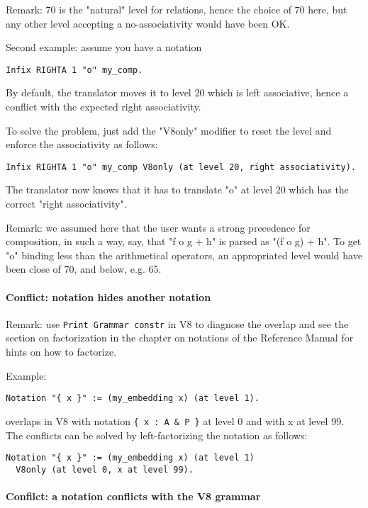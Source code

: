 \documentclass[11pt,a4paper]{article}
\begin{document}
Remark: 70 is the "natural" level for relations, hence the choice of 70
here, but any other level accepting a no-associativity would have been
OK.

Second example: assume you have a notation
\begin{verbatim}
Infix RIGHTA 1 "o" my_comp.
\end{verbatim}
By default, the translator moves it to level 20 which is left
associative, hence a conflict with the expected right associativity.

To solve the problem, just add the "V8only" modifier to reset the
level and enforce the associativity as follows:
\begin{verbatim}
Infix RIGHTA 1 "o" my_comp V8only (at level 20, right associativity).
\end{verbatim}
The translator now knows that it has to translate "o" at level 20
which has the correct "right associativity".

Remark: we assumed here that the user wants a strong precedence for
composition, in such a way, say, that "f o g + h" is parsed as
"(f o g) + h". To get "o" binding less than the arithmetical operators,
an appropriated level would have been close of 70, and below, e.g. 65.


\paragraph{Conflict: notation hides another notation}

Remark: use {\tt Print Grammar constr} in V8 to diagnose the overlap
and see the section on factorization in the chapter on notations of
the Reference Manual for hints on how to factorize.

Example:
\begin{verbatim}
Notation "{ x }" := (my_embedding x) (at level 1).
\end{verbatim}
overlaps in V8 with notation \verb#{ x : A & P }# at level 0 and with
x at level 99. The conflicts can be solved by left-factorizing the
notation as follows:
\begin{verbatim}
Notation "{ x }" := (my_embedding x) (at level 1)
  V8only (at level 0, x at level 99).
\end{verbatim}

\paragraph{Confilct: a notation conflicts with the V8 grammar}
\end{document}
